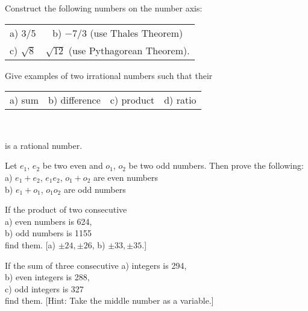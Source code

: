 \documentclass[11pt]{amsbook}
\begin{document}
\begin{exercise}
\label{ex:01:001}
	Construct the following numbers on the number axis:
	\begin{center}
	\begin{tabular}{cc}
		a) 3/5
		&b) $-7/3$ (use Thales Theorem)\\
		c) $\sqrt{8}$ \quad \quad
		&$\sqrt{12}$ (use Pythagorean Theorem).
	\end{tabular}
	\end{center}
\end{exercise}
\begin{exercise}
\label{ex:01:002}
Give examples of two irrational numbers such that their
	\begin{center}
	\begin{tabular}{llll}
		a) sum
		&b) difference
		&c) product
		&d) ratio
	\end{tabular}\\
	\end{center}
	is a rational number.
\end{exercise}
\begin{exercise}
\label{ex:01:003}
	Let $e_{1}$, $e_{2}$ be two even and 
	$o_{1}$, $o_{2}$ be two odd numbers.
	Then prove the following:\\
	a) 
	$e_{1} + e_{2}$, 
	$e_{1} e_{2}$, 
	$o_{1} + o_{2}$ are even numbers\\	
	b) 
	$e_{1} + o_{1}$, 
	$o_{1} o_{2}$
	are odd numbers
\end{exercise}
\begin{exercise}
\label{ex:01:004}
	If the product of two consecutive\\
	a) even numbers is 624,\\
	b) odd numbers is 1155\\
	find them.
	[a) $\pm 24, \pm 26$,
	b) $\pm 33, \pm35$.]
\end{exercise}
\begin{exercise}
\label{ex:01:005}
	If the sum of three consecutive
	a) integers is 294,\\
	b) even integers is 288,\\
	c) odd integers is 327\\
	find them.
	[Hint: Take the middle number as a variable.]  
\end{exercise}
\end{document}
